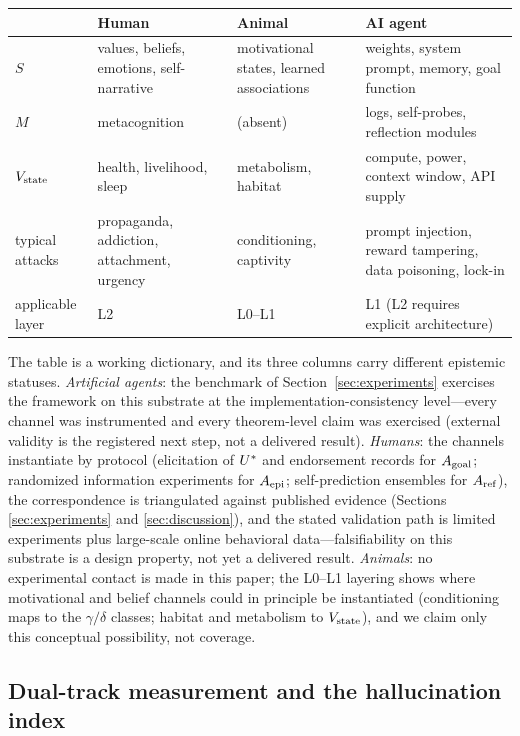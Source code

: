 \begin{center}
\small
\begin{tabularx}{\textwidth}{@{}l >{\raggedright\arraybackslash}X
>{\raggedright\arraybackslash}X >{\raggedright\arraybackslash}X@{}}
\toprule
 & Human & Animal & AI agent \\
\midrule
$S$ & values, beliefs, emotions, self-narrative & motivational states,
learned associations & weights, system prompt, memory, goal function \\
$M$ & metacognition & (absent) & logs, self-probes, reflection modules \\
$V_{\mathrm{state}}$ & health, livelihood, sleep & metabolism, habitat & compute, power,
context window, API supply \\
typical attacks & propaganda, addiction, attachment, urgency & conditioning,
captivity & prompt injection, reward tampering, data poisoning, lock-in \\
applicable layer & L2 & L0--L1 & L1 (L2 requires explicit architecture) \\
\bottomrule
\end{tabularx}
\end{center}

The table is a working dictionary, and its three columns carry different
epistemic statuses. \emph{Artificial agents}: the benchmark of
Section~\ref{sec:experiments} exercises the framework on this substrate at
the implementation-consistency level---every channel was instrumented and
every theorem-level claim was exercised (external validity is the registered
next step, not a delivered result). \emph{Humans}: the channels instantiate by
protocol (elicitation of $U^{*}$ and endorsement records for $A_{\mathrm{goal}}$;
randomized information experiments for $A_{\mathrm{epi}}$; self-prediction ensembles for
$A_{\mathrm{ref}}$), the correspondence is triangulated against published evidence
(Sections \ref{sec:experiments} and \ref{sec:discussion}), and the stated
validation path is limited experiments plus large-scale online behavioral
data---falsifiability on this substrate is a design property, not yet a
delivered result. \emph{Animals}: no experimental contact is made in this
paper; the L0--L1 layering shows where motivational and belief channels could
in principle be instantiated (conditioning maps to the $\gamma/\delta$
classes; habitat and metabolism to $V_{\mathrm{state}}$), and we claim only this conceptual
possibility, not coverage.

\subsection{Dual-track measurement and the hallucination index}\label{sec:dualtrack}

